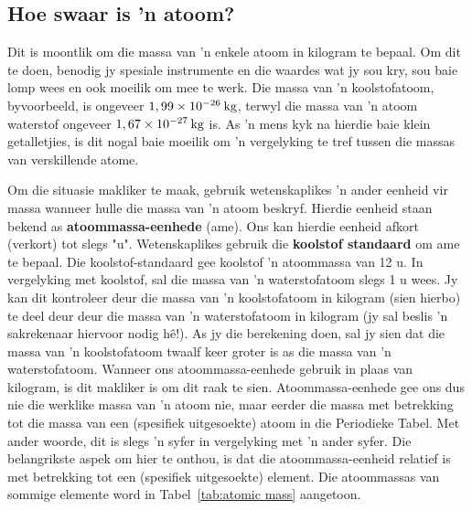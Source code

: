             \subsection*{Hoe swaar is  'n atoom?}
            \nopagebreak
        \label{m38756*id254863}
Dit is moontlik om die massa van  'n enkele atoom in kilogram te bepaal. Om dit te doen, benodig jy spesiale instrumente en die waardes wat jy sou kry, sou baie lomp wees en ook moeilik om mee te werk. Die massa van  'n koolstofatoom, byvoorbeeld, is ongeveer  $1,99\ensuremath{\times}{10}^{-26}\phantom{\rule{2pt}{0ex}}\text{kg}$, terwyl die massa van  'n atoom waterstof ongeveer $1,67\ensuremath{\times}{10}^{-27}\phantom{\rule{2pt}{0ex}}\text{kg}$ is. As  'n mens kyk na hierdie baie klein getalletjies, is dit nogal baie moeilik om   'n vergelyking te tref tussen die massas van verskillende atome.\par 
        \label{m38756*id254908}
Om die situasie makliker te maak, gebruik wetenskaplikes  'n ander eenheid vir massa wanneer hulle die massa van   'n atoom beskryf. Hierdie eenheid staan bekend as \textbf{atoommassa-eenhede} (ame). Ons kan hierdie eenheid afkort (verkort) tot slegs "u". Wetenskaplikes gebruik die \textbf{koolstof standaard} om ame te bepaal. Die koolstof-standaard gee koolstof  'n atoommassa van 12 u. In vergelyking met koolstof, sal die massa van  'n waterstofatoom slegs 1 u wees. Jy kan dit kontroleer deur die massa van  'n koolstofatoom in kilogram (sien hierbo) te deel deur deur die massa van  'n waterstofatoom in kilogram (jy sal beslis   'n sakrekenaar hiervoor nodig hê!). As jy die berekening doen, sal jy sien dat die massa van 'n
koolstofatoom twaalf keer groter is as die massa van  'n waterstofatoom. Wanneer ons atoommassa-eenhede gebruik in plaas van kilogram, is dit makliker is om dit raak te sien. Atoommassa-eenhede gee ons dus nie die werklike massa van  'n atoom nie, maar eerder die massa met betrekking tot die massa van een (spesifiek uitgesoekte) atoom in die Periodieke Tabel. Met ander woorde, dit is slegs  'n syfer in vergelyking met  'n ander syfer. Die belangrikste aspek om hier te onthou, is dat die atoommassa-eenheid relatief is met betrekking tot een (spesifiek uitgesoekte) element. Die atoommassas van sommige elemente word in Tabel~\ref{tab:atomic mass} aangetoon.
